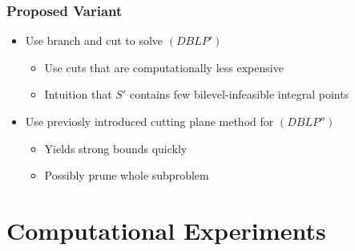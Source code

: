 \documentclass[11pt]{beamer}
\begin{document}
\begin{frame}
	\frametitle{Proposed Variant}
	\begin{itemize}
		\item Use branch and cut to solve $(DBLP')$
		\begin{itemize}
			\item Use cuts that are computationally less expensive
			\item Intuition that $S'$ contains few bilevel-infeasible integral points
		\end{itemize}
		\item Use previosly introduced cutting plane method for $(DBLP'')$
		\begin{itemize}
			\item Yields strong bounds quickly
			\item Possibly prune whole subproblem
		\end{itemize}
	\end{itemize}
\end{frame}

\section{Computational Experiments}
\end{document}

